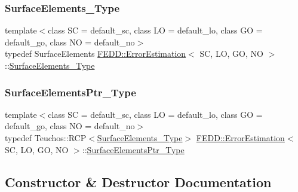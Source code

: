 \mbox{\label{classFEDD_1_1ErrorEstimation_a0d0800ed536b01a9a4873d0b3508d97a}} 
\subsubsection{\texorpdfstring{Surface\+Elements\+\_\+\+Type}{SurfaceElements\_Type}}
{\footnotesize\ttfamily template$<$class SC = default\+\_\+sc, class LO = default\+\_\+lo, class GO = default\+\_\+go, class NO = default\+\_\+no$>$ \\
typedef Surface\+Elements \hyperlink{classFEDD_1_1ErrorEstimation}{F\+E\+D\+D\+::\+Error\+Estimation}$<$ SC, LO, GO, NO $>$\+::\hyperlink{classFEDD_1_1ErrorEstimation_a0d0800ed536b01a9a4873d0b3508d97a}{Surface\+Elements\+\_\+\+Type}}

\mbox{\label{classFEDD_1_1ErrorEstimation_a391a95553efe67657e031e1af4ec02cc}} 
\subsubsection{\texorpdfstring{Surface\+Elements\+Ptr\+\_\+\+Type}{SurfaceElementsPtr\_Type}}
{\footnotesize\ttfamily template$<$class SC = default\+\_\+sc, class LO = default\+\_\+lo, class GO = default\+\_\+go, class NO = default\+\_\+no$>$ \\
typedef Teuchos\+::\+R\+CP$<$\hyperlink{classFEDD_1_1ErrorEstimation_a0d0800ed536b01a9a4873d0b3508d97a}{Surface\+Elements\+\_\+\+Type}$>$ \hyperlink{classFEDD_1_1ErrorEstimation}{F\+E\+D\+D\+::\+Error\+Estimation}$<$ SC, LO, GO, NO $>$\+::\hyperlink{classFEDD_1_1ErrorEstimation_a391a95553efe67657e031e1af4ec02cc}{Surface\+Elements\+Ptr\+\_\+\+Type}}



\subsection{Constructor \& Destructor Documentation}
\mbox{\label{classFEDD_1_1ErrorEstimation_a0d1a5ec84042b8ff0f7bb1375a4d77bd}} 
